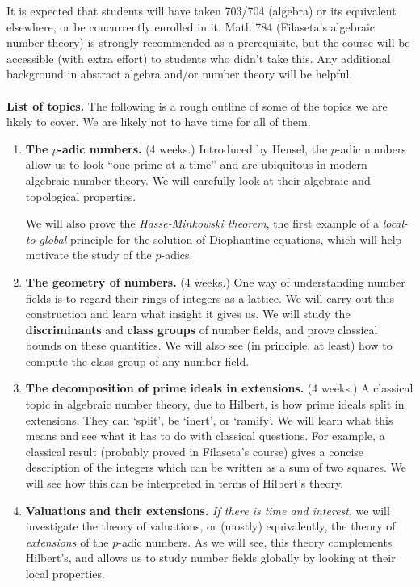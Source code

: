 \documentclass[11pt]{amsart}
\theoremstyle{remark}
\numberwithin{theorem}{section} \numberwithin{equation}{section}
\begin{document}
It is expected that students will have taken 703/704 (algebra) or its equivalent elsewhere, or be concurrently enrolled in it.
Math 784 (Filaseta's algebraic number theory) is strongly recommended as a prerequisite, but the course will be accessible (with
extra effort) to students who didn't take this. Any additional background in abstract algebra and/or number theory will be helpful.
\\
\\
{\bf List of topics.} The following is a rough outline of some of the topics we are likely to cover. We are likely not to have time for all of them.
\begin{enumerate}
\item {\bf The $p$-adic numbers.} (4 weeks.) 
Introduced by Hensel, the $p$-adic numbers allow us to look ``one prime at a time'' and are ubiquitous in
modern algebraic number theory. We will carefully look at their algebraic and topological properties.

We will also prove the {\itshape Hasse-Minkowski theorem}, the first example of a {\itshape local-to-global} principle for the solution
of Diophantine equations, which will help motivate the study of the $p$-adics.

\item {\bf The geometry of numbers.} (4 weeks.) One way of understanding number fields is to regard their rings of integers as a lattice. We will
carry out this construction and learn what insight it gives us. We will study the {\bf discriminants} and {\bf class groups} 
of number fields, and prove classical bounds on these quantities. We will also see (in principle, at least) how to compute the class group
of any number field.

\item {\bf The decomposition of prime ideals in extensions.} (4 weeks.) A classical topic in algebraic number theory, due to Hilbert,
is how prime ideals split in extensions. They can `split', be `inert', or `ramify'. We will learn what this means and see what it has
to do with classical questions. For example, a classical result (probably proved in Filaseta's course) gives a concise description of
the integers which can be written as a sum of two squares. We will see how this can be interpreted in terms of Hilbert's theory.

\item {\bf Valuations and their extensions.} {\itshape If there is time and interest}, we will investigate the theory of valuations,
or (mostly) equivalently, the theory of {\itshape extensions} of the $p$-adic numbers. As we will see, this theory complements Hilbert's,
and allows us to study number fields globally by looking at their local properties.


\end{enumerate}
\end{document}
